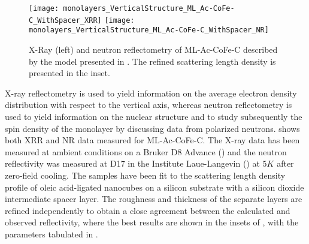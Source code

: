 \documentclass[\main/dresen_thesis.tex]{subfiles}
\begin{document}
  \label{sec:monolayers:structure:verticalModel}
  \begin{figure}[tb]
    \centering
    \texttt{[image: monolayers\_VerticalStructure\_ML\_Ac-CoFe-C\_WithSpacer\_XRR]}
    \texttt{[image: monolayers\_VerticalStructure\_ML\_Ac-CoFe-C\_WithSpacer\_NR]}
    \caption{\label{fig:monolayers:structure:XRR:ML-Ac-CoFe-C-WithSpacer}X-Ray (left) and neutron
    reflectometry of ML-Ac-CoFe-C described by the model presented in . The refined scattering length density is presented in the inset.}
  \end{figure}

  X-ray reflectometry is used to yield information on the average electron density distribution with respect to the vertical axis, whereas neutron reflectometry is used to yield information on the nuclear structure and to study subsequently the spin density of the monolayer by discussing data from polarized neutrons.
   shows both XRR and NR data measured for ML-Ac-CoFe-C.
  The X-ray data has been measured at ambient conditions on a Bruker D8 Advance () and the neutron reflectivity was measured at D17 in the Institute Laue-Langevin () at $5 \unit{K}$ after zero-field cooling.
  The samples have been fit to the scattering length density profile of oleic acid-ligated nanocubes on a silicon
  substrate with a silicon dioxide intermediate spacer layer.
  The roughness and thickness of the separate layers are refined independently to obtain a close agreement between the calculated and observed reflectivity, where the best results are shown in the insets of , with the parameters tabulated in .
\end{document}
